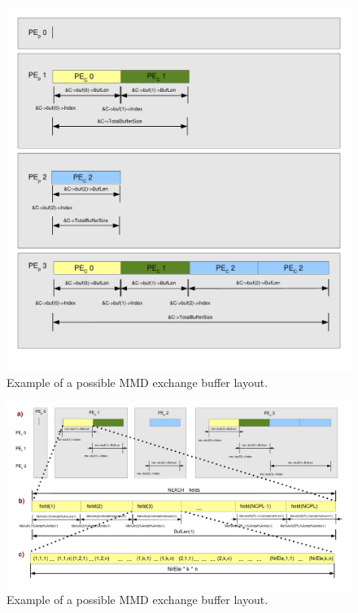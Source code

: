 \documentclass[twoside]{article}
\begin{document}
\begin{figure}
\begin{center} 
\includegraphics[width=\textwidth]{MMDlib_idxdef_server.pdf} 
\end{center} 
\vspace*{-1.5cm}
\caption{Example of a possible MMD exchange buffer layout.} 
\label{fig:idserver} 
\end{figure} 

\begin{figure}
\begin{center} 
\includegraphics[angle=90, height=0.95\textheight]{MMDlib_idxdef_client.pdf} 
\end{center} 
\caption{Example of a possible MMD exchange buffer layout.} 
\label{fig:idclient} 
\end{figure} 
\end{document}
